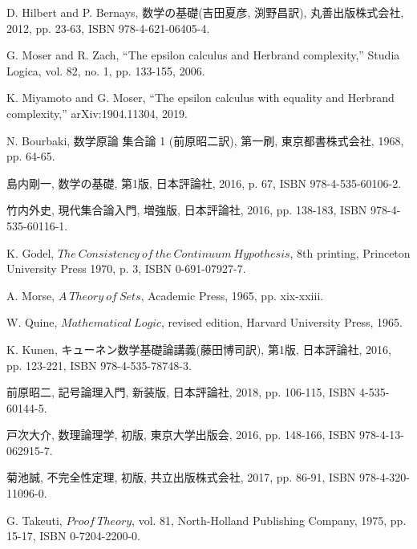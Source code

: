 \begin{thebibliography}{数字}
	 D. Hilbert and P. Bernays, 数学の基礎(吉田夏彦, 渕野昌訳), 丸善出版株式会社, 2012, pp. 23-63, ISBN 978-4-621-06405-4.
	
	 G. Moser and R. Zach, ``The epsilon calculus and Herbrand complexity,''
		Studia Logica, vol. 82, no. 1, pp. 133-155, 2006.
	
	 K. Miyamoto and G. Moser, ``The epsilon calculus with equality and Herbrand complexity,'' arXiv:1904.11304, 2019.
	
	 N. Bourbaki, 数学原論 集合論 1 (前原昭二訳), 第一刷, 東京都書株式会社, 1968, pp. 64-65.
	
	 島内剛一, 数学の基礎, 第1版, 日本評論社, 2016, p. 67, ISBN 978-4-535-60106-2.
	
	 竹内外史, 現代集合論入門, 増強版, 日本評論社, 2016, pp. 138-183, ISBN 978-4-535-60116-1.
	
	 K. G$\ddot{\mbox{o}}$del, $The\ Consistency\ of\ the\ Continuum\ Hypothesis$, 8th printing, Princeton University Press 1970, p. 3, ISBN 0-691-07927-7.
	
	 A. Morse, $A\ Theory\ of\ Sets$, Academic Press, 1965, pp. xix-xxiii.
	
	 W. Quine, $Mathematical\ Logic$, revised edition, Harvard University Press, 1965.
	
	 K. Kunen, キューネン数学基礎論講義(藤田博司訳), 第1版, 日本評論社, 2016, pp. 123-221, ISBN 978-4-535-78748-3. 
	
	 前原昭二, 記号論理入門, 新装版, 日本評論社, 2018, pp. 106-115, ISBN 4-535-60144-5.
	
	 戸次大介, 数理論理学, 初版, 東京大学出版会, 2016, pp. 148-166, ISBN 978-4-13-062915-7.
	
	 菊池誠, 不完全性定理, 初版, 共立出版株式会社, 2017, pp. 86-91, ISBN 978-4-320-11096-0.
	
	 G. Takeuti, $Proof\ Theory$, vol. 81, North-Holland Publishing Company, 1975, pp. 15-17, ISBN 0-7204-2200-0. 
\end{thebibliography}